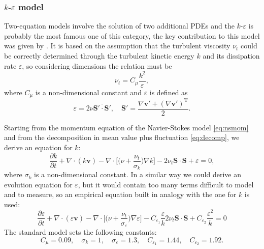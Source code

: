 \subsubsection{$k\text{-}\varepsilon$ model}
Two-equation models involve the solution of two additional PDEs and the 
$k\text{-}\varepsilon$ is probably the most famous one of this category, the 
key contribution to this model was given by \textcite{turbo:ke}. It is 
based on the assumption that the turbulent viscosity $\nu_t$ could be correctly 
determined through the turbulent kinetic energy $k$ and its dissipation rate 
$\varepsilon$, so considering dimensions the relation must be
\begin{equation}
\nu_t = C_\mu \frac{k^2}{\varepsilon},
\end{equation}
where $C_\mu$ is a non-dimensional constant and $\varepsilon$ is defined as
\begin{equation}
\varepsilon = 2 \nu \overline{\mathbf{S}' \cdot \mathbf{S}'}, \quad \mathbf{S}' 
= \frac{\nabla \mathbf{v}' + (\nabla \mathbf{v}')^\mathrm{T}}{2}.
\end{equation}

Starting from the momentum equation of the Navier-Stokes model \eqref{eq:nsmom} 
and from the decomposition in mean value plus fluctuation \eqref{eq:decomp}, we 
derive an equation for $k$:
\begin{equation}
	\frac{\partial k}{\partial t} + \nabla \cdot (k\mathbf{v}) - \nabla \cdot
	\bigg[ \bigg(\nu + \frac{\nu_t}{\sigma_k}\bigg) \nabla k\bigg] 
	-2\nu_t \mathbf{S} \cdot \mathbf{S} + \varepsilon = 0,
\end{equation}
where $\sigma_k$ is a non-dimensional constant. In a similar way we could 
derive an evolution equation for $\varepsilon$, but it would contain too many 
terms difficult to model and to measure, so an empirical equation built in 
analogy with the one for $k$ is used:
\begin{equation} \label{eq:epsilon}
		\frac{\partial \varepsilon}{\partial t} + \nabla \cdot (\varepsilon 
		\mathbf{v}) - \nabla \cdot \bigg[ \bigg(\nu + 
		\frac{\nu_t}{\sigma_\varepsilon} 
		\bigg) \nabla \varepsilon \bigg] - C_{\varepsilon_1} 
		\frac{\varepsilon}{k} 2 \nu_t \mathbf{S} \cdot \mathbf{S} + 
		C_{\varepsilon_2}\frac{\varepsilon^2}{k} = 0
\end{equation}
The standard model sets the following constants:
\begin{equation}
	C_\mu = 0.09, \quad \sigma_k = 1, \quad \sigma_\varepsilon = 1.3, \quad 
	C_{\varepsilon_1} = 1.44, \quad C_{\varepsilon_2} = 1.92.
\end{equation}

